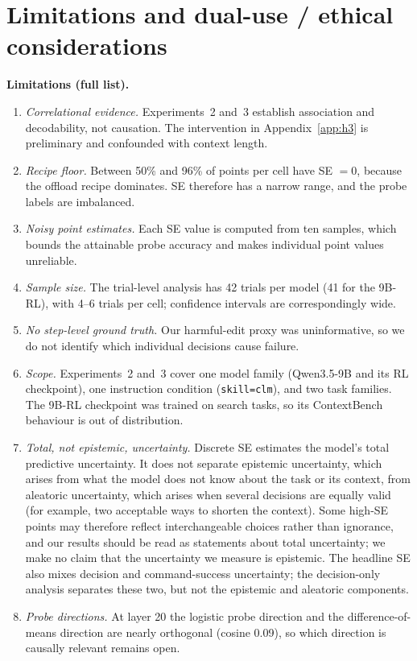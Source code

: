 \documentclass{article}
\begin{document}
\section{Limitations and dual-use / ethical considerations}
\label{app:limitations}

\textbf{Limitations (full list).}
\begin{enumerate}
    \item \emph{Correlational evidence.} Experiments~2 and~3 establish association and decodability, not causation.
    The intervention in Appendix~\ref{app:h3} is preliminary and confounded with context length.
    \item \emph{Recipe floor.} Between 50\% and 96\% of points per cell have SE $=0$, because the offload recipe dominates.
    SE therefore has a narrow range, and the probe labels are imbalanced.
    \item \emph{Noisy point estimates.} Each SE value is computed from ten samples, which bounds the attainable probe accuracy and makes individual point values unreliable.
    \item \emph{Sample size.} The trial-level analysis has 42 trials per model (41 for the 9B-RL), with 4--6 trials per cell; confidence intervals are correspondingly wide.
    \item \emph{No step-level ground truth.} Our harmful-edit proxy was uninformative, so we do not identify which individual decisions cause failure.
    \item \emph{Scope.} Experiments~2 and~3 cover one model family (Qwen3.5-9B and its RL checkpoint), one instruction condition (\texttt{skill=clm}), and two task families.
    The 9B-RL checkpoint was trained on search tasks, so its ContextBench behaviour is out of distribution.
    \item \emph{Total, not epistemic, uncertainty.} Discrete SE estimates the model's total predictive uncertainty.
    It does not separate epistemic uncertainty, which arises from what the model does not know about the task or its context, from aleatoric uncertainty, which arises when several decisions are equally valid (for example, two acceptable ways to shorten the context).
    Some high-SE points may therefore reflect interchangeable choices rather than ignorance, and our results should be read as statements about total uncertainty; we make no claim that the uncertainty we measure is epistemic.
    The headline SE also mixes decision and command-success uncertainty; the decision-only analysis separates these two, but not the epistemic and aleatoric components.
    \item \emph{Probe directions.} At layer 20 the logistic probe direction and the difference-of-means direction are nearly orthogonal (cosine 0.09), so which direction is causally relevant remains open.
\end{enumerate}
\end{document}
